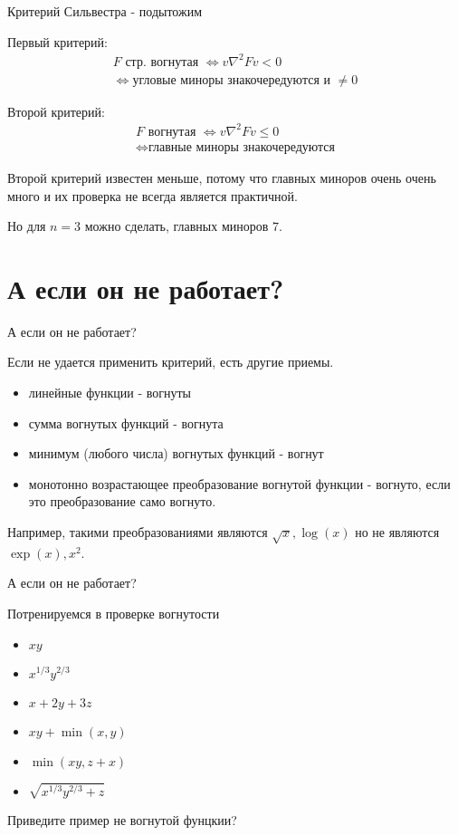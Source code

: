 \documentclass{beamer}
\begin{document}
\begin{frame}{Критерий Сильвестра - подытожим}

Первый критерий:
\begin{gather*} F \text{ стр. вогнутая } \Leftrightarrow v \nabla^2 F v < 0 \\
\Leftrightarrow \text{угловые миноры знакочередуются и }\neq 0\end{gather*}

Второй критерий:
\begin{gather*}F \text{ вогнутая } \Leftrightarrow v \nabla^2 F v \leqslant 0 \\ 
\Leftrightarrow \text{главные миноры знакочередуются}\end{gather*}

Второй критерий известен меньше, потому что главных миноров очень очень много и их проверка не всегда является практичной. 

Но для $n = 3$ можно сделать, главных миноров $7$.

\end{frame}


\section{А если он не работает?}

\begin{frame}{А если он не работает?}

Если не удается применить критерий, есть другие приемы.

\begin{itemize}
  \item линейные функции - вогнуты
  \item сумма вогнутых функций - вогнута
  \item минимум (любого числа) вогнутых функций - вогнут
  \item монотонно возрастающее преобразование вогнутой функции - вогнуто, если это преобразование само вогнуто. 
\end{itemize}

Например, такими преобразованиями являются $\sqrt{x}, \log(x)$ но не являются $\exp(x), x^2$.
 
\end{frame}

\begin{frame}{А если он не работает?}

Потренируемся в проверке вогнутости

\begin{itemize}
  \item $x y$
  \item $x^{1/3} y ^{2/3}$
  \item $x + 2y + 3 z$
  \item $x y + \min(x, y)$
  \item $\min(x y, z + x)$
  \item $\sqrt{x^{1/3} y ^{2/3} + z}$
\end{itemize}

Приведите пример не вогнутой фунцкии?
 
\end{frame}
\end{document}
